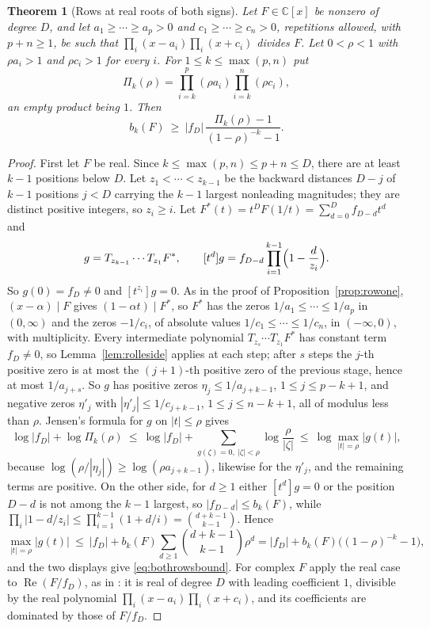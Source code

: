 \documentclass[11pt]{article}
\newtheorem{theorem}{Theorem}[section]
\begin{document}
\begin{theorem}[Rows at real roots of both signs]\label{thm:bothsigns}
Let $F\in\mathbb C[x]$ be nonzero of degree $D$, and let
$a_1\ge\cdots\ge a_p>0$ and $c_1\ge\cdots\ge c_n>0$, repetitions allowed, with
$p+n\ge1$, be such that $\prod_{i}(x-a_i)\prod_i(x+c_i)$ divides $F$.  Let
$0<\rho<1$ with $\rho a_i>1$ and $\rho c_i>1$ for every $i$.  For
$1\le k\le\max(p,n)$ put
\[
  \Pi_k(\rho)=\prod_{i=k}^{p}(\rho a_i)\prod_{i=k}^{n}(\rho c_i),
\]
an empty product being $1$.  Then
\begin{equation}\label{eq:bothrowsbound}
  b_k(F)\ \ge\ |f_D|\,\frac{\Pi_k(\rho)-1}{(1-\rho)^{-k}-1}.
\end{equation}
\end{theorem}

\begin{proof}
First let $F$ be real.  Since $k\le\max(p,n)\le p+n\le D$, there are at least
$k-1$ positions below $D$.  Let $z_1<\cdots<z_{k-1}$ be the backward distances
$D-j$ of $k-1$ positions $j<D$ carrying the $k-1$ largest nonleading
magnitudes; they are distinct positive integers, so $z_i\ge i$.  Let
$F^*(t)=t^DF(1/t)=\sum_{d=0}^Df_{D-d}t^d$ and
\[
  g=T_{z_{k-1}}\cdots T_{z_1}F^*,\qquad
  [t^d]g=f_{D-d}\prod_{i=1}^{k-1}\Bigl(1-\frac d{z_i}\Bigr).
\]
So $g(0)=f_D\ne0$ and $[t^{z_i}]g=0$.  As in the proof of
Proposition~\ref{prop:rowone}, $(x-\alpha)\mid F$ gives $(1-\alpha t)\mid F^*$,
so $F^*$ has the zeros $1/a_1\le\cdots\le1/a_p$ in $(0,\infty)$ and the zeros
$-1/c_i$, of absolute values $1/c_1\le\cdots\le1/c_n$, in $(-\infty,0)$, with
multiplicity.  Every intermediate polynomial $T_{z_s}\cdots T_{z_1}F^*$ has
constant term $f_D\ne0$, so Lemma~\ref{lem:rolleside} applies at each step;
after $s$ steps the $j$-th positive zero is at most the $(j+1)$-th positive
zero of the previous stage, hence at most $1/a_{j+s}$.  So $g$ has positive
zeros $\eta_j\le1/a_{j+k-1}$, $1\le j\le p-k+1$, and negative zeros
$\eta'_j$ with $|\eta'_j|\le1/c_{j+k-1}$, $1\le j\le n-k+1$, all of modulus
less than $\rho$.  Jensen's formula for $g$ on $|t|\le\rho$ gives
\[
  \log|f_D|+\log\Pi_k(\rho)\ \le\
  \log|f_D|+\sum_{g(\zeta)=0,\ |\zeta|<\rho}\log\frac\rho{|\zeta|}\ \le\
  \log\max_{|t|=\rho}|g(t)|,
\]
because $\log(\rho/|\eta_j|)\ge\log(\rho a_{j+k-1})$, likewise for the
$\eta'_j$, and the remaining terms are positive.  On the other side, for
$d\ge1$ either $[t^d]g=0$ or the position $D-d$ is not among the $k-1$ largest,
so $|f_{D-d}|\le b_k(F)$, while
$\prod_i|1-d/z_i|\le\prod_{i=1}^{k-1}(1+d/i)=\binom{d+k-1}{k-1}$.  Hence
\[
  \max_{|t|=\rho}|g(t)|\ \le\ |f_D|+b_k(F)\sum_{d\ge1}\binom{d+k-1}{k-1}\rho^d
  =|f_D|+b_k(F)\bigl((1-\rho)^{-k}-1\bigr),
\]
and the two displays give \eqref{eq:bothrowsbound}.  For complex $F$ apply the
real case to $\operatorname{Re}(F/f_D)$, as in \cite[Corollary~3.3]{coefficient-mass}: it
is real of degree $D$ with leading coefficient $1$, divisible by the real
polynomial $\prod_i(x-a_i)\prod_i(x+c_i)$, and its coefficients are dominated
by those of $F/f_D$.
\end{proof}
\end{document}
